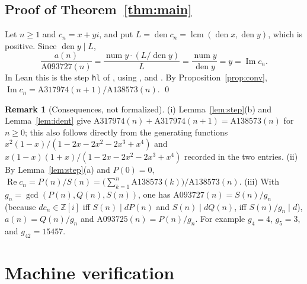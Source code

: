 \documentclass[11pt]{amsart}
\theoremstyle{plain}
\theoremstyle{definition}
\newtheorem{remark}[theorem]{Remark}
\newcommand{\Z}{\mathbb{Z}}
\newcommand{\seq}[1]{\mathrm{A#1}}
\DeclareMathOperator{\re}{Re}
\DeclareMathOperator{\im}{Im}
\DeclareMathOperator{\den}{den}
\DeclareMathOperator{\num}{num}
\begin{document}
\subsection{Proof of Theorem~\ref{thm:main}}
Let $n\ge1$ and $c_n=x+yi$, and put $L=\den c_n=\operatorname{lcm}(\den x,\den y)$, which is positive. Since $\den y\mid L$,
\[
\frac{a(n)}{\seq{093727}(n)}=\frac{\num y\cdot(L/\den y)}{L}=\frac{\num y}{\den y}=y=\im c_n.
\]
In Lean this is the step \texttt{hl} of , using ,  and . By Proposition~\ref{prop:conv}, $\im c_n=\seq{317974}(n+1)/\seq{138573}(n)$. \qed

\begin{remark}[Consequences, not formalized]
(i) Lemma~\ref{lem:step}(b) and Lemma~\ref{lem:ident} give $\seq{317974}(n)+\seq{317974}(n+1)=\seq{138573}(n)$ for $n\ge0$; this also follows directly from the generating functions $x^2(1-x)/(1-2x-2x^2-2x^3+x^4)$ and $x(1-x)(1+x)/(1-2x-2x^2-2x^3+x^4)$ recorded in the two entries.
(ii) By Lemma~\ref{lem:step}(a) and $P(0)=0$, $\re c_n=P(n)/S(n)=\bigl(\sum_{k=1}^n\seq{138573}(k)\bigr)/\seq{138573}(n)$.
(iii) With $g_n=\gcd(P(n),Q(n),S(n))$, one has $\seq{093727}(n)=S(n)/g_n$ (because $dc_n\in\Z[i]$ iff $S(n)\mid dP(n)$ and $S(n)\mid dQ(n)$, iff $S(n)/g_n\mid d$), $a(n)=Q(n)/g_n$ and $\seq{093725}(n)=P(n)/g_n$. For example $g_4=4$, $g_5=3$, and $g_{42}=15457$.
\end{remark}

\section{Machine verification}\label{sec:lean}
\end{document}
